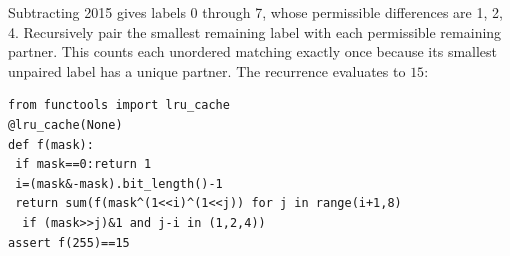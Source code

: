 Subtracting 2015 gives labels 0 through 7, whose permissible differences are 1, 2, 4. Recursively pair the smallest remaining label with each permissible remaining partner. This counts each unordered matching exactly once because its smallest unpaired label has a unique partner. The recurrence evaluates to $\boxed{15}$:
\begin{verbatim}
from functools import lru_cache
@lru_cache(None)
def f(mask):
 if mask==0:return 1
 i=(mask&-mask).bit_length()-1
 return sum(f(mask^(1<<i)^(1<<j)) for j in range(i+1,8)
  if (mask>>j)&1 and j-i in (1,2,4))
assert f(255)==15
\end{verbatim}
